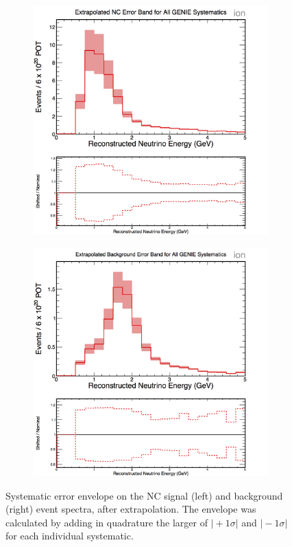 \begin{figure}[h]
  \centering
  \begin{subfigure}{.48\textwidth}
    \centering
    \includegraphics[width=1\linewidth]{figures/cNCEXGENIESysts.png}
  \end{subfigure}
  \begin{subfigure}{.48\textwidth}
    \centering
    \includegraphics[width=1\linewidth]{figures/cBGEXGENIESysts.png}
  \end{subfigure}
  \caption[GENIE Systematic Error Envelopes]{Systematic error envelope on the NC signal (left) and background (right) event spectra, after extrapolation. The envelope was calculated by adding in quadrature the larger of $\vert +1\sigma \vert$ and $\vert -1\sigma \vert$ for each individual systematic.}
  \label{fig:SystGENIE}
\end{figure}


